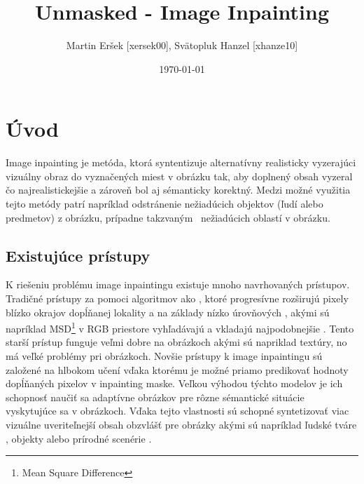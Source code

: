 \documentclass [11pt, a4paper]{article}
\title{Unmasked - Image Inpainting}
\author{Martin Eršek [xersek00], Svätopluk Hanzel [xhanze10]}
\date{\today}
\begin{document}
	\maketitle
	
	\section{Úvod}
	Image inpainting je metóda, ktorá syntentizuje alternatívny realisticky vyzerajúci vizuálny obraz do vyznačených miest v obrázku tak, aby doplnený obsah vyzeral čo najrealistickejšie a zároveň bol aj sémanticky korektný. Medzi možné využitia tejto metódy patrí napríklad odstránenie nežiadúcich objektov (ľudí alebo predmetov) z obrázku, prípadne takzvaným \, nežiadúcich oblastí v obrázku.
	
	\subsection{Existujúce prístupy}
	K riešeniu problému image inpaintingu existuje mnoho navrhovaných prístupov. Tradičné  prístupy za pomoci  algoritmov ako \cite{quilting, Efros99}, ktoré progresívne rozširujú pixely blízko okrajov dopĺňanej lokality a na základy nízko úrovňových , akými sú napríklad MSD\footnote{Mean Square Difference} v RGB priestore vyhľadávajú a vkladajú  najpodobnejšie . Tento starší prístup funguje veľmi dobre na  obrázkoch akými sú napriklad textúry, no má veľké problémy pri  obrázkoch.
	Novšie prístupy k image inpaintingu sú založené na hlbokom učení vďaka ktorému je možné priamo predikovať hodnoty dopĺňaných pixelov v inpainting maske. Veľkou výhodou týchto modelov je ich schopnosť naučiť sa adaptívne  obrázkov pre rôzne sémantické situácie vyskytujúce sa v obrázkoch. Vďaka tejto vlastnosti sú schopné syntetizovať viac vizuálne uveriteľnejší obsah obzvlášť pre obrázky akými sú napríklad ľudské tváre \cite{li2017generative, yeh2017semantic, globloc, yu2018generative, yu2018free}, objekty \cite{pathak2016context, yu2018free} alebo prírodné scenérie \cite{globloc, yu2018generative, yu2018free}.
	
\end{document}

